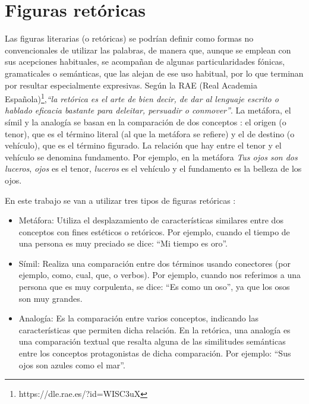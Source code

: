 


\section{Figuras retóricas}
\label{cap:sec:figurasretoricas}

Las figuras literarias (o retóricas) se podrían definir \citep{GalianaYCasas1994} como formas no convencionales de utilizar las palabras, de manera que, aunque se emplean con sus acepciones habituales, se acompañan de algunas particularidades fónicas, gramaticales o semánticas, que las alejan de ese uso habitual, por lo que terminan por resultar especialmente expresivas. 
Según la RAE (Real Academia Española)\footnote{https://dle.rae.es/?id=WISC3uX},\textit{``la retórica es el arte de bien decir, de dar al lenguaje escrito o hablado eficacia bastante para deleitar, persuadir o conmover''}.
La metáfora, el símil y la analogía se basan en la comparación de dos conceptos  \citep{GalianaYCasas1994}: el origen (o tenor), que es el término literal (al que la metáfora se refiere) y el de destino (o vehículo), que es el término figurado. La relación que hay entre el tenor y el vehículo se denomina fundamento. Por ejemplo, en la metáfora \textit{Tus ojos son dos luceros}, \textit{ojos} es el tenor, \textit{luceros} es el vehículo y el fundamento es la belleza de los ojos.


En este trabajo se van a utilizar tres tipos de figuras retóricas \citep{TFMPaloma}: 
\begin{itemize}
	\item Metáfora: Utiliza el desplazamiento de características similares entre dos conceptos con fines estéticos o retóricos. Por ejemplo, cuando el tiempo de una persona es muy preciado se dice: ``Mi tiempo es oro''.
	
	\item Símil: Realiza una comparación entre dos términos usando conectores (por ejemplo, como, cual, que, o verbos).
	Por ejemplo, cuando nos referimos a una persona que es muy corpulenta, se dice: ``Es como un oso'', ya que los osos son muy grandes.
	
	\item Analogía: Es la comparación entre varios conceptos, indicando las características que permiten dicha relación. En la retórica, una analogía es una comparación textual que resalta alguna de las similitudes semánticas entre los conceptos protagonistas de dicha comparación. Por ejemplo: ``Sus ojos son azules como el mar''.
	
	
	
\end{itemize}

